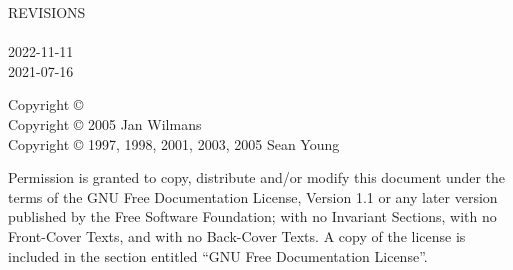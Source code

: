 \begingroup
	{\WorkInProgressFullScreen}

	\vspace*{\fill} %

	{\Large\textbf{\BookTitle}}

	\vspace*{0.1cm}

	{\large\AuthorNameSurname}

	\LatestRevisionName

	REVISIONS\\
	\LatestRevisionDate\\
	2022-11-11\\
	2021-07-16

	\vspace*{0.2cm}

	Copyright {\copyright} \LatestYear ~\AuthorNameSurname\\	%
	Copyright {\copyright} 2005 Jan Wilmans\\
	Copyright {\copyright} 1997, 1998, 2001, 2003, 2005 Sean Young

	Permission is granted to copy, distribute and/or modify this document under the terms of the GNU Free Documentation License, Version 1.1 or any later version published by the Free Software Foundation; with no Invariant Sections, with no Front-Cover Texts, and with no Back-Cover Texts. A copy of the license is included in the section entitled ``GNU Free Documentation License''.
\endgroup
